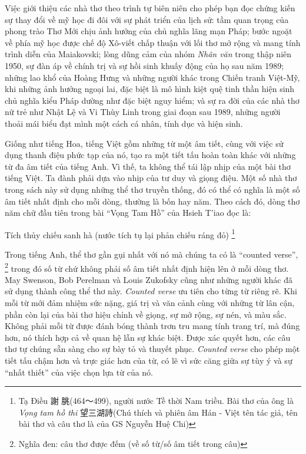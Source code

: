 \documentclass[../main.tex]{subfiles}
\begin{document}
\begin{multicols}{2}
Việc giới thiệu các nhà thơ theo trình tự biên niên cho phép bạn đọc chứng kiến sự thay đổi về mỹ học đi đôi với sự phát triển của lịch sử: tầm quan trọng của phong trào Thơ Mới chịu ảnh hưởng của chủ nghĩa lãng mạn Pháp; bước ngoặt về phía mỹ học được chế độ Xô-viết chấp thuận với lối thơ mở rộng và mang tính trình diễn của Maiakovski; lòng dũng cảm của nhóm \textit{Nhân văn} trong thập niên 1950, sự đàn áp về chính trị và sự hồi sinh khuấy động của họ sau năm 1989; những lao khổ của Hoàng Hưng và những người khác trong Chiến tranh Việt-Mỹ, khi những ảnh hưởng ngoại lai, đặc biệt là mô hình kiệt quệ tinh thần hiện sinh chủ nghĩa kiểu Pháp dường như đặc biệt nguy hiểm; và sự ra đời của các nhà thơ nữ trẻ như Nhật Lệ và Vi Thùy Linh trong giai đoạn sau 1989, những người thoải mái biểu đạt mình một cách cá nhân, tính dục và hiện sinh. 
 
Giống như tiếng Hoa, tiếng Việt gồm những từ một âm tiết, cùng với việc sử dụng thanh điệu phức tạp của nó, tạo ra một tiết tấu hoàn toàn khác với những từ đa âm tiết của tiếng Anh. Vì thế, ta không thể tái lập nhịp của một bài thơ tiếng Việt. Ta đành phải dựa vào nhịp của tư duy và giọng điệu. Một số nhà thơ trong sách này sử dụng những thể thơ truyền thống, đó có thể có nghĩa là một số âm tiết nhất định cho mỗi dòng, thường là bốn hay năm. Theo cách đó, dòng thơ năm chữ đầu tiên trong bài “Vọng Tam Hồ” của Hsieh T’iao đọc là:        
\begin{blockquote}
        
Tích thủy chiếu sanh hà (nước tích tụ lại phản chiếu ráng đỏ) \footnote{
Tạ Điều 謝 朓(464～499), người nước Tề thời Nam triều. Bài thơ của ông là \textit{Vọng tam hồ thi }望三湖詩(Chú thích và phiên âm Hán - Việt tên tác giả, tên bài thơ và câu thơ là của GS Nguyễn Huệ Chi)}  

\end{blockquote}
 
Trong tiếng Anh, thể thơ gần gụi nhất với nó mà chúng ta có là “counted verse”, \footnote{
Nghĩa đen: câu thơ được đếm (về số từ/số âm tiết trong câu)}  trong đó số từ chứ không phải số âm tiết nhất định hiện lên ở mỗi dòng thơ. May Swenson, Bob Perelman và Louis Zukofsky cũng như những người khác đã sử dụng thành công thể thơ này. \textit{Counted verse} ưu tiên cho từng từ riêng rẽ. Khi mỗi từ mới đảm nhiệm sức nặng, giá trị và văn cảnh cùng với những từ lân cận, phần còn lại của bài thơ hiệu chỉnh về giọng, sự mở rộng, sự nén, và màu sắc. Không phải mỗi từ được đánh bóng thành trơn tru mang tính trang trí, mà đúng hơn, nó thích hợp cả về quan hệ lẫn sự khác biệt. Được xác quyết hơn, các câu thơ tự chúng sẵn sàng cho sự bày tỏ và thuyết phục. \textit{Counted verse} cho phép một tiết tấu chậm hơn và trực giác hơn của từ, có lẽ vì sức căng giữa sự tùy ý và sự “nhất thiết” của việc chọn lựa từ của nó. 
 

\end{multicols}
\end{document}
